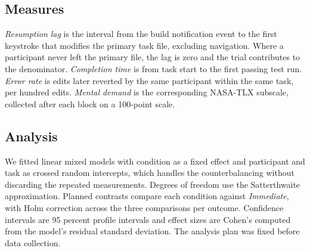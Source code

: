 \subsection{Measures}

\emph{Resumption lag} is the interval from the build notification event to the
first keystroke that modifies the primary task file, excluding navigation.
Where a participant never left the primary file, the lag is zero and the trial
contributes to the denominator. \emph{Completion time} is from task start to
the first passing test run. \emph{Error rate} is edits later reverted by the
same participant within the same task, per hundred edits. \emph{Mental demand}
is the corresponding NASA-TLX subscale, collected after each block on a
100-point scale.

\subsection{Analysis}

We fitted linear mixed models with condition as a fixed effect and participant
and task as crossed random intercepts, which handles the counterbalancing
without discarding the repeated measurements. Degrees of freedom use the
Satterthwaite approximation. Planned contrasts compare each condition against
\emph{Immediate}, with Holm correction across the three comparisons per
outcome. Confidence intervals are 95 percent profile intervals and effect sizes
are Cohen's \cohensd{} computed from the model's residual standard deviation.
The analysis plan was fixed before data collection.
